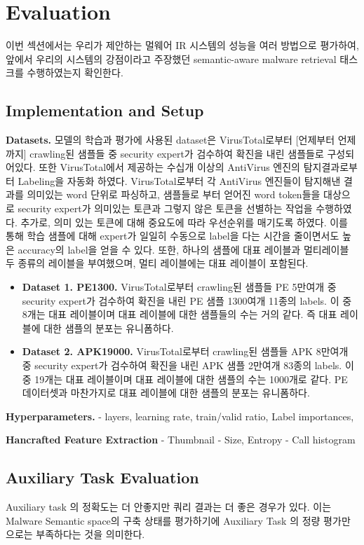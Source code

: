 \section{Evaluation}
이번 섹션에서는 우리가 제안하는 멀웨어 IR 시스템의 성능을 여러 방법으로 평가하여, 앞에서 우리의 시스템의 강점이라고 주장했던 semantic-aware malware retrieval 태스크를 수행하였는지 확인한다. 


\subsection{Implementation and Setup}
\textbf{Datasets. } 
모델의 학습과 평가에 사용된 dataset은 VirusTotal로부터 [언제부터 언제까지] crawling된 샘플들 중 security expert가 검수하여 확진을 내린 샘플들로 구성되어있다. 또한 VirusTotal에서 제공하는 수십개 이상의 AntiVirus 엔진의 탐지결과로부터 Labeling을 자동화 하였다. VirusTotal로부터 각 AntiVirus 엔진들이 탐지해낸 결과를 의미있는 word 단위로 파싱하고, 샘플들로 부터 얻어진 word token들을 대상으로 security expert가 의미있는 토큰과 그렇지 않은 토큰을 선별하는 작업을 수행하였다. 추가로, 의미 있는 토큰에 대해 중요도에 따라 우선순위를 매기도록 하였다. 이를 통해 학습 샘플에 대해 expert가 일일히 수동으로 label을 다는 시간을 줄이면서도 높은 accuracy의 label을 얻을 수 있다. 또한, 하나의 샘플에 대표 레이블과 멀티레이블 두 종류의 레이블을 부여했으며, 멀티 레이블에는 대표 레이블이 포함된다. 

\begin{itemize}
	\item{ \textbf{Dataset 1. PE1300. } VirusTotal로부터 crawling된 샘플들 PE 5만여개 중 security expert가 검수하여 확진을 내린 PE 샘플 1300여개 11종의 labels. 이 중 8개는 대표 레이블이며 대표 레이블에 대한 샘플들의 수는 거의 같다. 즉 대표 레이블에 대한 샘플의 분포는 유니폼하다.
	}
	\item{ \textbf{Dataset 2. APK19000. } VirusTotal로부터 crawling된 샘플들 APK 8만여개 중 security expert가 검수하여 확진을 내린 APK 샘플 2만여개 83종의 labels. 이 중 19개는 대표 레이블이며 대표 레이블에 대한 샘플의 수는 1000개로 같다. PE 데이터셋과 마찬가지로 대표 레이블에 대한 샘플의 분포는 유니폼하다.  
	}
\end{itemize}



\textbf{Hyperparameters. }
- layers, learning rate, train/valid ratio, Label importances, 


\textbf{Hancrafted Feature Extraction}
- Thumbnail
- Size, Entropy
- Call histogram


\subsection{Auxiliary Task Evaluation}
Auxiliary task 의 정확도는 더 안좋지만 쿼리 결과는 더 좋은 경우가 있다. 이는 Malware Semantic space의 구축 상태를 평가하기에 Auxiliary Task 의 정량 평가만으로는 부족하다는 것을 의미한다. 



